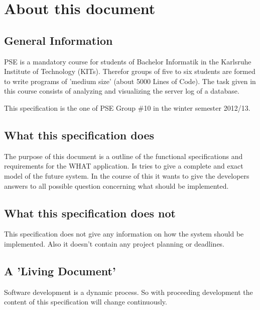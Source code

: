 \section*{About this document}


\subsection*{General Information}
PSE is a mandatory course for students of Bachelor Informatik in the %
Karlsruhe Institute of Technology (\glspl{KIT}). Therefor groups of five to six
students are formed to write programs of 'medium size' (about 5000 Lines of Code). 
The task given in this course consists of analyzing and visualizing the server log of a database.

This specification is the one of PSE Group \#10 in the winter semester 2012/13.


\subsection*{What this specification does}
The purpose of this document is a outline of the functional specifications and requirements
for the WHAT application. Is tries to give a complete and exact model of the future system.
In the course of this it wants to give the developers answers to all possible question concerning
what should be implemented.


\subsection*{What this specification does not}
This specification does not give any information on how the system should be implemented. 
Also it doesn't contain any project planning or deadlines.


\subsection*{A 'Living Document'}
Software development is a dynamic process. So with proceeding development the
content of this specification will change continuously. 


